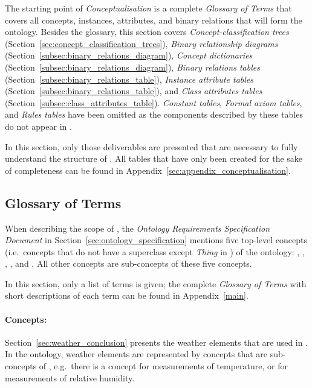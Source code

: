 The starting point of \emph{Conceptualisation} is a complete \emph{Glossary of Terms} that covers all concepts, instances, attributes, and binary relations that will form the ontology. Besides the glossary, this section covers \emph{Concept-classification trees} (Section~\ref{sec:concept_classification_trees}), \emph{Binary relationship diagrams} (Section~\ref{subsec:binary_relations_diagram}), \emph{Concept dictionaries} (Section~\ref{subsec:binary_relations_diagram}), \emph{Binary relations tables} (Section~\ref{subsec:binary_relations_table}), \emph{Instance attribute tables} (Section~\ref{subsec:binary_relations_table}), and \emph{Class attributes tables} (Section~\ref{subsec:class_attributes_table}). \emph{Constant tables}, \emph{Formal axiom tables}, and \emph{Rules tables} have been omitted as the components described by these tables do not appear in \smarthomeweather.

In this section, only those deliverables are presented that are necessary to fully understand the structure of \smarthomeweather. All tables that have only been created for the sake of completeness can be found in Appendix~\ref{sec:appendix_conceptualisation}.

\subsection{Glossary of Terms}
\label{sec:ontology_glossary}

When describing the scope of \smarthomeweather, the \emph{Ontology Requirements Specification Document} in Section~\ref{sec:ontology_specification} mentions five top-level concepts (i.e.\ concepts that do not have a superclass except \emph{Thing} in ) of the ontology: , , , , and . All other concepts are sub-concepts of these five concepts.

In this section, only a list of terms is given; the complete \emph{Glossary of Terms} with short descriptions of each term can be found in Appendix~\ref{main}.

\paragraph{Concepts:}

Section~\ref{sec:weather_conclusion} presents the weather elements that are used in \smarthomeweather. In the ontology, weather elements are represented by concepts that are sub-concepts of , e.g.\ there is a concept  for measurements of temperature, or  for measurements of relative humidity.

